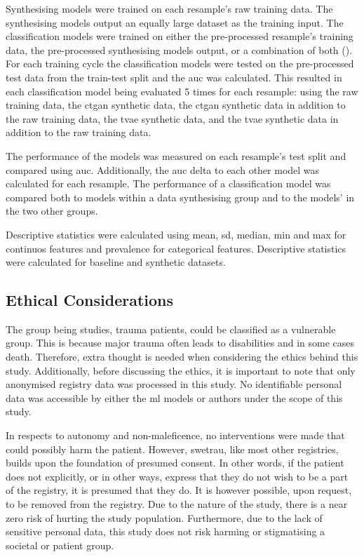 \documentclass[12pt, letterpaper]{article}
\begin{document}
Synthesising models were trained on each resample's raw training data. The synthesising models output an equally large dataset as the training input. The classification models were trained on either the pre-processed resample's training data, the pre-processed synthesising models output, or a combination of both (). For each training cycle the classification models were tested on the pre-processed test data from the train-test split and the \acrshort{auc} was calculated. This resulted in each classification model being evaluated 5 times for each resample: using the raw training data, the \acrshort{ctgan} synthetic data, the \acrshort{ctgan} synthetic data in addition to the raw training data, the \acrshort{tvae} synthetic data, and the \acrshort{tvae} synthetic data in addition to the raw training data.

The performance of the models was measured on each resample's test split and compared using \acrfull{auc}. Additionally, the \acrshort{auc} delta to each other model was calculated for each resample. The performance of a classification model was compared both to models within a data synthesising group and to the models' in the two other groups.

Descriptive statistics were calculated using mean, \acrfull{sd}, median, min and max for continuos features and prevalence for categorical features. Descriptive statistics were calculated for baseline and synthetic datasets.

\subsection{Ethical Considerations}
The group being studies, trauma patients, could be classified as a vulnerable group. This is because major trauma often leads to disabilities and in some cases death. Therefore, extra thought is needed when considering the ethics behind this study. Additionally, before discussing the ethics, it is important to note that only anonymised registry data was processed in this study. No identifiable personal data was accessible by either the \acrshort{ml} models or authors under the scope of this study.

In respects to autonomy and non-maleficence, no interventions were made that could possibly harm the patient. However, \acrshort{swetrau}, like most other registries, builds upon the foundation of presumed consent. In other words, if the patient does not explicitly, or in other ways, express that they do not wish to be a part of the registry, it is presumed that they do. It is however possible, upon request, to be removed from the registry. Due to the nature of the study, there is a near zero risk of hurting the study population. Furthermore, due to the lack of sensitive personal data, this study does not risk harming or stigmatising a societal or patient group.
\end{document}
